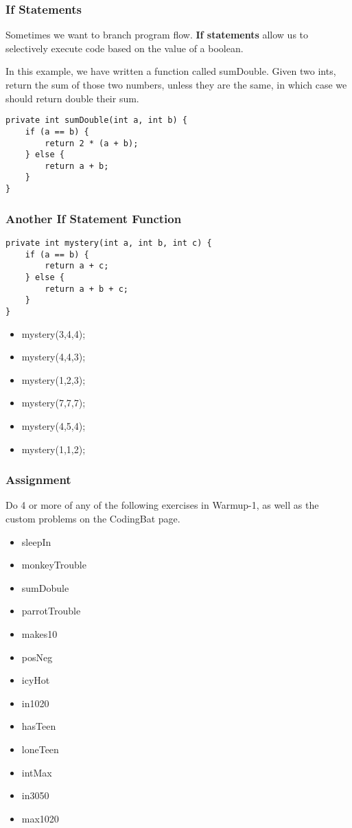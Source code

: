 \documentclass{beamer}
\begin{document}
\begin{frame}[fragile]
\frametitle{If Statements}
Sometimes we want to branch program flow. \textbf{If statements} allow us to selectively execute code based on the value of a boolean.
\pause

In this example, we have written a function called sumDouble. Given two ints, return the sum of those two numbers, unless they are the same, in which case we should return double their sum.
\pause
\begin{lstlisting}
private int sumDouble(int a, int b) {
    if (a == b) {
        return 2 * (a + b);
    } else {
        return a + b;
    }
}
\end{lstlisting}
\end{frame}

\begin{frame}[fragile]
\frametitle{Another If Statement Function}
\begin{lstlisting}
private int mystery(int a, int b, int c) {
    if (a == b) {
        return a + c;
    } else {
        return a + b + c;
    }
}
\end{lstlisting}
\begin{itemize}
\item<2->mystery(3,4,4);
\item<3->mystery(4,4,3);
\item<4->mystery(1,2,3);
\item<5->mystery(7,7,7);
\item<6->mystery(4,5,4);
\item<7->mystery(1,1,2);
\end{itemize}
\end{frame}

\begin{frame}
\frametitle{Assignment}
Do 4 or more of any of the following exercises in Warmup-1, as well as the custom problems on the CodingBat page.
\begin{itemize}
\item sleepIn
\item monkeyTrouble
\item sumDobule
\item parrotTrouble
\item makes10
\item posNeg
\item icyHot
\item in1020
\item hasTeen
\item loneTeen
\item intMax
\item in3050
\item max1020
\end{itemize}
\end{frame}
\end{document}
